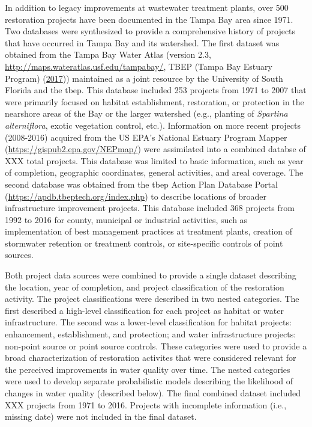 \documentclass[]{article}
\begin{document}
In addition to legacy improvements at wastewater treatment plants, over
500 restoration projects have been documented in the Tampa Bay area
since 1971. Two databases were synthesized to provide a comprehensive
history of projects that have occurred in Tampa Bay and its watershed.
The first dataset was obtained from the Tampa Bay Water Atlas (version
2.3, \url{http://maps.wateratlas.usf.edu/tampabay/}, TBEP (Tampa Bay
Estuary Program) (\protect\hyperlink{ref-TBEP17}{2017})) maintained as a
joint resource by the University of South Florida and the \ac{tbep}.
This database included 253 projects from 1971 to 2007 that were
primarily focused on habitat establishment, restoration, or protection
in the nearshore areas of the Bay or the larger watershed (e.g.,
planting of \emph{Spartina alterniflora}, exotic vegetation control,
etc.). Information on more recent projects (2008-2016) acquired from the
US EPA's National Estuary Program Mapper
(\url{https://gispub2.epa.gov/NEPmap/}) were assimilated into a combined
databse of XXX total projects. This database was limited to basic
information, such as year of completion, geographic coordinates, general
activities, and areal coverage. The second database was obtained from
the \ac{tbep} Action Plan Database Portal
(\url{https://apdb.tbeptech.org/index.php}) to describe locations of
broader infrastructure improvement projects. This database included 368
projects from 1992 to 2016 for county, municipal or industrial
activities, such as implementation of best management practices at
treatment plants, creation of stormwater retention or treatment
controls, or site-specific controls of point sources.

Both project data sources were combined to provide a single dataset
describing the location, year of completion, and project classification
of the restoration activity. The project classifications were described
in two nested categories. The first described a high-level
classification for each project as habitat or water infrastructure. The
second was a lower-level classification for habitat projects:
enhancement, establishment, and protection; and water infrastructure
projects: non-point source or point source controls. These categories
were used to provide a broad characterization of restoration activites
that were considered relevant for the perceived improvements in water
quality over time. The nested categories were used to develop separate
probabilistic models describing the likelihood of changes in water
quality (described below). The final combined dataset included XXX
projects from 1971 to 2016. Projects with incomplete information (i.e.,
missing date) were not included in the final dataset.
\end{document}
